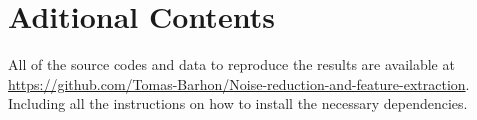 \chapter{Aditional Contents}

All of the source codes and data to reproduce the results are 
available at 
\href{https://github.com/Tomas-Barhon/Noise-reduction-and-feature-extraction-with-principal-component-analysis}{https://github.com/Tomas-Barhon/Noise-reduction-and-feature-extraction}. 
Including all the instructions on how to install the necessary dependencies.

